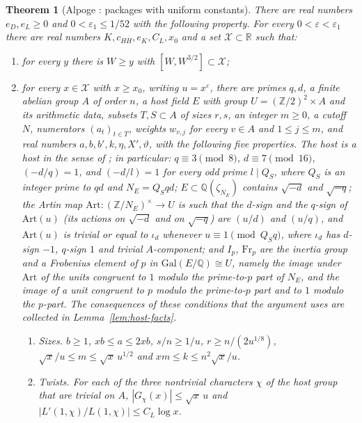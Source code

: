 \documentclass[10pt]{amsart}
\newtheorem{theorem}{Theorem}[section]
\theoremstyle{definition}
\theoremstyle{remark}
\newcommand{\R}{\mathbb R}
\newcommand{\Z}{\mathbb Z}
\newcommand{\Q}{\mathbb Q}
\begin{document}
\begin{theorem}[Alpoge \cite{CharacterFamily}: packages with uniform constants]\label{thm:alpoge-families}
There are real numbers $e_D,e_L\ge0$ and $0<\varepsilon_1\le1/52$ with the
following property. For every $0<\varepsilon<\varepsilon_1$ there are real
numbers $K,c_{HH},e_K,C_L,x_0$ and a set $\mathcal X\subset\R$ such that:
\begin{enumerate}
\item[(a)] for every $y$ there is $W\ge y$ with $[W,W^{3/2}]\subset\mathcal X$;
\item[(b)] for every $x\in\mathcal X$ with $x\ge x_0$, writing $u=x^\varepsilon$,
there are primes $q,d$, a finite abelian group $A$ of order $n$, a host field
$E$ with group $U=(\Z/2)^2\times A$ and its arithmetic data, subsets
$T,S\subset A$ of sizes $r,s$, an integer $m\ge0$, a cutoff $N$, numerators
$(a_t)_{t\in T}$, weights $w_{v,j}$ for every $v\in A$ and $1\le j\le m$, and
real numbers $a,b,b',k,\eta,X',\vartheta$, with the following five properties.
The host is a host in the sense of \cite[Definition~\ref{A-i4:def-host}]{Annex};
in particular: $q\equiv3\pmod8$, $d\equiv7\pmod{16}$, $(-d/q)=1$, and
$(-d/l)=1$ for every odd prime $l\mid Q_S$, where $Q_S$ is an integer prime
to $qd$ and $N_E=Q_Sqd$; $E\subset\Q(\zeta_{N_E})$ contains $\sqrt{-d}$ and
$\sqrt{-q}$; the Artin map $\mathrm{Art}:(\Z/N_E)^\times\to U$ is such that
the $d$-sign and the $q$-sign of $\mathrm{Art}(u)$ (its actions on
$\sqrt{-d}$ and on $\sqrt{-q}$) are $(u/d)$ and $(u/q)$, and
$\mathrm{Art}(u)$ is trivial or equal to $\iota_d$ whenever $u\equiv1\pmod{Q_Sq}$, where
$\iota_d$ has $d$-sign $-1$, $q$-sign $1$ and trivial $A$-component; and
$I_p$, $\mathrm{Fr}_p$ are the inertia group and a Frobenius element of $p$
in $\mathrm{Gal}(E/\Q)\cong U$, namely the image under $\mathrm{Art}$ of the
units congruent to $1$ modulo the prime-to-$p$ part of $N_E$, and the image
of a unit congruent to $p$ modulo the prime-to-$p$ part and to $1$ modulo
the $p$-part. The consequences of these conditions that the argument uses
are collected in Lemma~\ref{lem:host-facts}.
\begin{enumerate}
\item[(1)] \emph{Sizes.} $b\ge1$, $xb\le a\le2xb$, $s/n\ge1/u$,
$r\ge n/(2u^{1/8})$, $\sqrt x/u\le m\le\sqrt x\,u^{1/2}$ and
$xm\le k\le n^2\sqrt x/u$.
\item[(2)] \emph{Twists.} For each of the three nontrivial characters $\chi$
of the host group that are trivial on $A$, $|G_\chi(x)|\le\sqrt x\,u$ and
$|L'(1,\chi)/L(1,\chi)|\le C_L\log x$.

\end{enumerate}
\end{enumerate}
\end{theorem}
\end{document}
